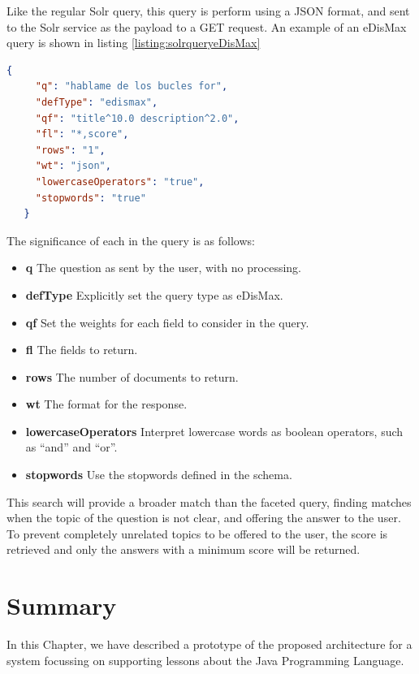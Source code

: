 Like the regular Solr query, this query is perform using a JSON format, and sent to the Solr service as the payload to a GET request. An example of an \ac{eDisMax} query is shown in listing \ref{listing:solrqueryeDisMax}

\begin{center} 
  \begin{lstlisting}[language=json, caption=Example \ac{eDisMax} query for Solr, label=listing:solrqueryeDisMax]
   {
     "q": "hablame de los bucles for",
     "defType": "edismax",
     "qf": "title^10.0 description^2.0",
     "fl": "*,score",
     "rows": "1",
     "wt": "json",
     "lowercaseOperators": "true",
     "stopwords": "true"
   }  
  \end{lstlisting}
\end{center}

The significance of each in the query is as follows:

\begin{itemize}
 \item \textbf{q} The question as sent by the user, with no processing.
 \item \textbf{defType} Explicitly set the query type as \ac{eDisMax}.
 \item \textbf{qf} Set the weights for each field to consider in the query.
 \item \textbf{fl} The fields to return.
 \item \textbf{rows} The number of documents to return.
 \item \textbf{wt} The format for the response.
 \item \textbf{lowercaseOperators} Interpret lowercase words as boolean operators, such as ``and'' and ``or''.
 \item \textbf{stopwords} Use the stopwords defined in the schema.
\end{itemize}

This search will provide a broader match than the faceted query, finding matches when the topic of the question is not clear, and offering the answer to the user. To prevent completely unrelated topics to be offered to the user, the score is retrieved and only the answers with a minimum score will be returned.

\section{Summary}

In this Chapter, we have described a prototype of the proposed architecture for a system focussing on supporting lessons about the Java Programming Language.


